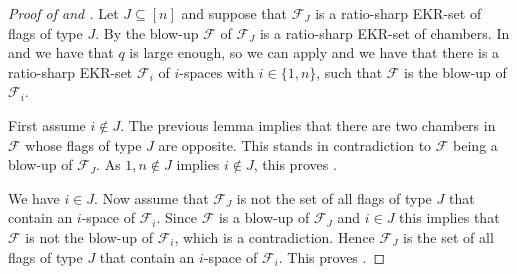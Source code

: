 \documentclass[11pt]{article}
\newcommand{\EKR}{\mathcal{F}}
\begin{document}
\begin{proof}[Proof of  and ]
Let $J\subseteq [n]$ and suppose that $\EKR_J$ is a ratio-sharp EKR-set of flags of type $J$. By  the blow-up $\EKR$ of $\EKR_J$ is a ratio-sharp EKR-set of chambers. 
In  and  we have that $q$ is large enough, so we can apply  and we have that there is a ratio-sharp EKR-set $\EKR_i$ of $i$-spaces with $i\in \{1,n\}$, such that $\EKR$ is the blow-up of $\EKR_i$. 


First assume $i\notin J$. The previous lemma implies that there are two chambers in $\EKR$ whose flags of type $J$ are opposite. This stands in contradiction to $\EKR$ being a blow-up of $\EKR_J$. As $1,n\notin J$ implies $i\notin J$, this proves .

We have $i\in J$. Now assume that $\EKR_J$ is not the set of all flags of type $J$ that contain an $i$-space of $\EKR_i$. Since $\EKR$ is a blow-up of $\EKR_J$ and $i\in J$ this implies that $\EKR$ is not the blow-up of $\EKR_i$, which is a contradiction.
Hence  $\EKR_J$ is the set of all flags of type $J$ that contain an $i$-space of $\EKR_i$. This proves .
%
%
\end{proof}

\end{document}
